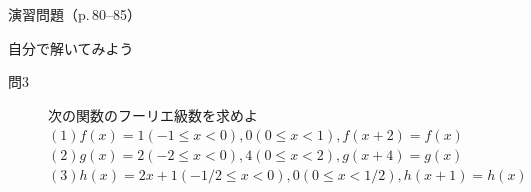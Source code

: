 \documentclass[aspectratio=43,professionalfonts,handout]{beamer}
\begin{document}
\begin{frame}{演習問題（p.\,80--85）}
  \begin{exampleblock}{自分で解いてみよう}
  \begin{description}
    \item[問3] 次の関数のフーリエ級数を求めよ
    $(1) f(x) = { 1  (-1 \leq x < 0),  0  (0 \leq x < 1) },  f(x+2) = f(x)$\\
    $(2) g(x) = { 2  (-2 \leq x < 0),  4  (0 \leq x < 2) },  g(x+4) = g(x)$\\
    $(3) h(x) = { 2x+1  (-1/2 \leq x < 0),  0  (0 \leq x < 1/2) },  h(x+1) = h(x)$\\
  \end{description}
  \end{exampleblock}
\end{frame}
\end{document}
